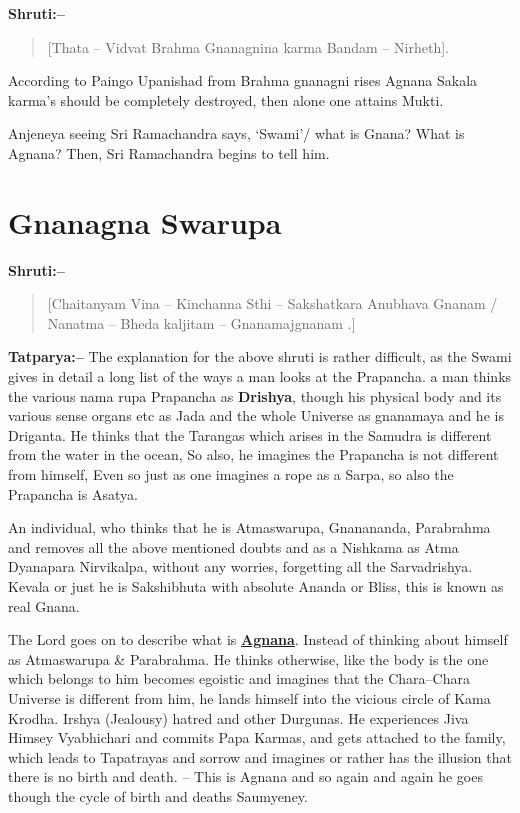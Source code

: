 \textbf{Shruti:–}

\begin{verse}
[Thata – Vidvat Brahma Gnanagnina karma Bandam – Nirheth].
\end{verse}

According to Paingo Upanishad from Brahma gnanagni rises Agnana Sakala karma's should be completely destroyed, then alone one attains Mukti.

Anjeneya seeing Sri Ramachandra says, ‘Swami’/ what is Gnana? What is Agnana? Then, Sri Ramachandra begins to tell him.

\chapter{Gnanagna Swarupa}

\textbf{Shruti:–}

\begin{verse}
[Chaitanyam Vina – Kinchanna Sthi – Sakshatkara Anubhava Gnanam / Nanatma – Bheda kaljitam – Gnanamajgnanam .]
\end{verse}

\textbf{Tatparya:–} The explanation for the above shruti is rather difficult, as the Swami gives in detail a long list of the ways a man looks at the Prapancha. a man thinks the various nama rupa Prapancha as \textbf{Drishya}, though his physical body and its various sense organs etc as Jada and the whole Universe as gnanamaya and he is Driganta. He thinks that the Tarangas which arises in the Samudra is different from the water in the ocean, So also, he imagines the Prapancha is not different from himself, Even so just as one imagines a rope as a Sarpa, so also the Prapancha is Asatya.

An individual, who thinks that he is Atmaswarupa, Gnanananda, Parabrahma and removes all the above mentioned doubts and as a Nishkama as Atma Dyanapara Nirvikalpa, without any worries, forgetting all the Sarvadrishya. Kevala or just he is Sakshibhuta with absolute Ananda or Bliss, this is known as real Gnana.

The Lord goes on to describe what is \textbf{\underline{Agnana}}. Instead of thinking about himself as Atmaswarupa \& Parabrahma. He thinks otherwise, like the body is the one which belongs to him becomes egoistic and imagines that the Chara–Chara Universe is different from him, he lands himself into the vicious circle of Kama Krodha. Irshya (Jealousy) hatred and other Durgunas. He experiences Jiva Himsey Vyabhichari and commits Papa Karmas, and gets attached to the family, which leads to Tapatrayas and sorrow and imagines or rather has the illusion that there is no birth and death. – This is Agnana and so again and again he goes though the cycle of birth and deaths Saumyeney.

